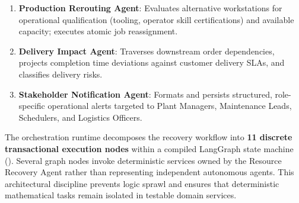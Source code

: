 \documentclass[10pt,twocolumn,a4paper]{article}
\begin{document}
\begin{enumerate}
\begin{itemize}
    \end{itemize}
    \item \textbf{Production Rerouting Agent}: Evaluates alternative workstations for operational qualification (tooling, operator skill certifications) and available capacity; executes atomic job reassignment.
    \item \textbf{Delivery Impact Agent}: Traverses downstream order dependencies, projects completion time deviations against customer delivery SLAs, and classifies delivery risks.
    \item \textbf{Stakeholder Notification Agent}: Formats and persists structured, role-specific operational alerts targeted to Plant Managers, Maintenance Leads, Schedulers, and Logistics Officers.
\end{enumerate}

The orchestration runtime decomposes the recovery workflow into \textbf{11 discrete transactional execution nodes} within a compiled LangGraph state machine (). Several graph nodes invoke deterministic services owned by the Resource Recovery Agent rather than representing independent autonomous agents. This architectural discipline prevents logic sprawl and ensures that deterministic mathematical tasks remain isolated in testable domain services.
\end{document}
